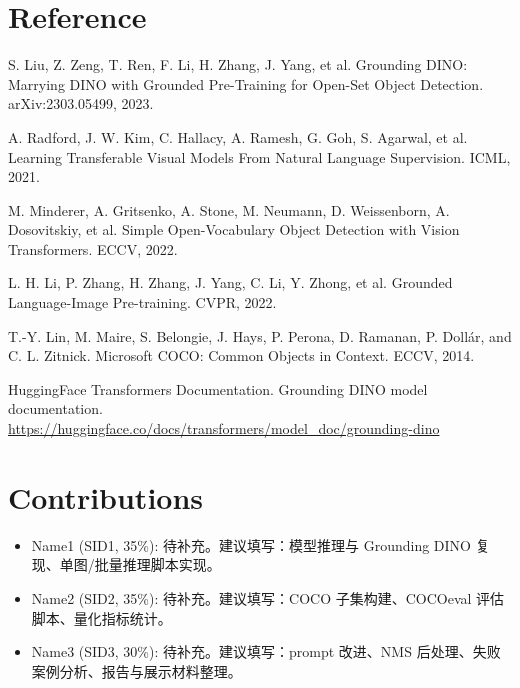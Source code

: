 \documentclass[UTF8,a4paper,11pt]{ctexart}
\begin{document}
\section*{Reference}

\begin{enumerate}[label={[\arabic*]}]
  \item S. Liu, Z. Zeng, T. Ren, F. Li, H. Zhang, J. Yang, et al. Grounding DINO: Marrying DINO with Grounded Pre-Training for Open-Set Object Detection. arXiv:2303.05499, 2023.
  \item A. Radford, J. W. Kim, C. Hallacy, A. Ramesh, G. Goh, S. Agarwal, et al. Learning Transferable Visual Models From Natural Language Supervision. ICML, 2021.
  \item M. Minderer, A. Gritsenko, A. Stone, M. Neumann, D. Weissenborn, A. Dosovitskiy, et al. Simple Open-Vocabulary Object Detection with Vision Transformers. ECCV, 2022.
  \item L. H. Li, P. Zhang, H. Zhang, J. Yang, C. Li, Y. Zhong, et al. Grounded Language-Image Pre-training. CVPR, 2022.
  \item T.-Y. Lin, M. Maire, S. Belongie, J. Hays, P. Perona, D. Ramanan, P. Dollár, and C. L. Zitnick. Microsoft COCO: Common Objects in Context. ECCV, 2014.
  \item HuggingFace Transformers Documentation. Grounding DINO model documentation. \url{https://huggingface.co/docs/transformers/model_doc/grounding-dino}
\end{enumerate}

\section*{Contributions}

\begin{itemize}
  \item Name1 (SID1, 35\%): 待补充。建议填写：模型推理与 Grounding DINO 复现、单图/批量推理脚本实现。
  \item Name2 (SID2, 35\%): 待补充。建议填写：COCO 子集构建、COCOeval 评估脚本、量化指标统计。
  \item Name3 (SID3, 30\%): 待补充。建议填写：prompt 改进、NMS 后处理、失败案例分析、报告与展示材料整理。
\end{itemize}
\end{document}
